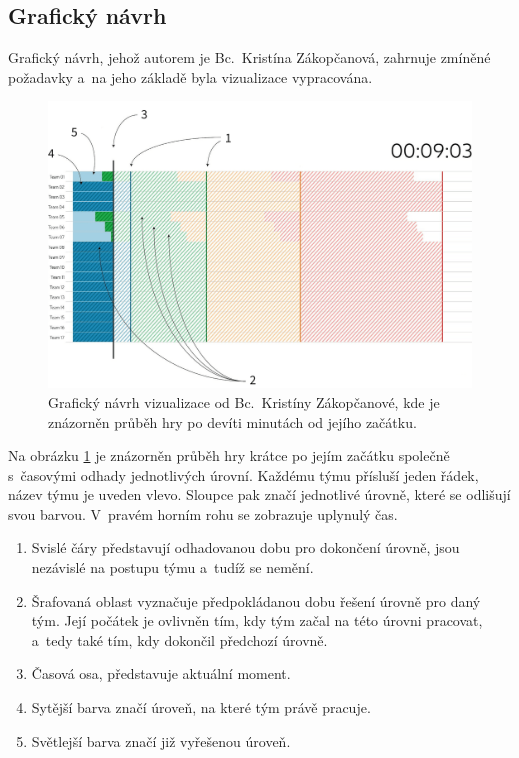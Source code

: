 \documentclass[
  digital, %
  oneside, %
  table,   %
  nolof,     %
  nolot,     %
]{fithesis3}
\begin{document}
\subsection{Grafický návrh}
Grafický návrh, jehož autorem je Bc.~Kristína Zákopčanová, zahrnuje zmíněné požadavky a~na jeho základě byla vizualizace vypracována.\par
\begin{figure}[h]
  \begin{center}
    \includegraphics[width=12.7cm]{images/navrh-vizualizace-1-4.png}
  \end{center}
  \caption{Grafický návrh vizualizace od Bc.~Kristíny Zákopčanové, kde je znázorněn průběh hry po devíti minutách od jejího začátku.}
  \label{fig:progress1}
\end{figure}
Na obrázku \ref{fig:progress1} je znázorněn průběh hry krátce po jejím začátku společně s~časovými odhady jednotlivých úrovní. Každému týmu přísluší jeden řádek, název týmu je uveden vlevo. Sloupce pak značí jednotlivé úrovně, které se odlišují svou barvou. V~pravém horním rohu se zobrazuje uplynulý čas.
\begin{enumerate}
  \item Svislé čáry představují odhadovanou dobu pro dokončení úrovně, jsou nezávislé na postupu týmu a~tudíž se nemění.
  \item Šrafovaná oblast vyznačuje předpokládanou dobu řešení úrovně pro daný tým. Její počátek je ovlivněn tím, kdy tým začal na této úrovni pracovat, a~tedy také tím, kdy dokončil předchozí úrovně.
  \item Časová osa, představuje aktuální moment.
  \item Sytější barva značí úroveň, na které tým právě pracuje.
  \item Světlejší barva značí již vyřešenou úroveň.
\end{enumerate}
\end{document}
